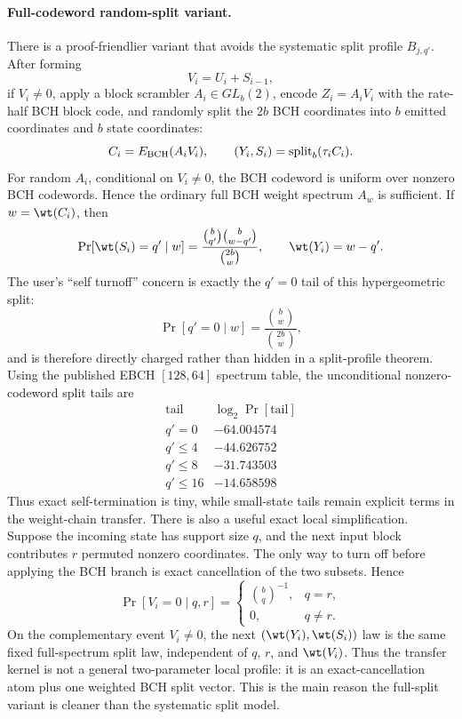 \paragraph{Full-codeword random-split variant.}
There is a proof-friendlier variant that avoids the systematic split profile \(B_{j,q'}\).  After forming
\[
V_i=U_i+S_{i-1},
\]
if \(V_i\ne0\), apply a block scrambler \(A_i\in GL_b(2)\), encode \(Z_i=A_iV_i\) with the rate-half BCH block code,
and randomly split the \(2b\) BCH coordinates into \(b\) emitted coordinates and \(b\) state coordinates:
\[
C_i=E_{\rm BCH}(A_iV_i),\qquad (Y_i,S_i)=\operatorname{split}_b(\tau_i C_i).
\]
For random \(A_i\), conditional on \(V_i\ne0\), the BCH codeword is uniform over nonzero BCH codewords.  Hence the
ordinary full BCH weight spectrum \(A_w\) is sufficient.  If \(w=\wt(C_i)\), then
\[
\Pr[\wt(S_i)=q'\mid w]
=
\frac{\binom{b}{q'}\binom{b}{w-q'}}{\binom{2b}{w}},
\qquad
\wt(Y_i)=w-q'.
\]
The user's ``self turnoff'' concern is exactly the \(q'=0\) tail of this hypergeometric split:
\[
\Pr[q'=0\mid w]=\frac{\binom{b}{w}}{\binom{2b}{w}},
\]
and is therefore directly charged rather than hidden in a split-profile theorem.  Using the published
EBCH \([128,64]\) spectrum table, the unconditional nonzero-codeword split tails are
\[
\begin{array}{c|c}
\text{tail} & \log_2\Pr[\text{tail}]\\
\hline
q'=0 & -64.004574\\
q'\le4 & -44.626752\\
q'\le8 & -31.743503\\
q'\le16 & -14.658598
\end{array}
\]
Thus exact self-termination is tiny, while small-state tails remain explicit terms in the weight-chain transfer.
There is also a useful exact local simplification.  Suppose the incoming state has support size \(q\), and the next
input block contributes \(r\) permuted nonzero coordinates.  The only way to turn off before applying the BCH branch is
exact cancellation of the two subsets.  Hence
\[
\Pr[V_i=0\mid q,r]
=
\begin{cases}
\binom{b}{q}^{-1}, & q=r,\\
0, & q\ne r.
\end{cases}
\]
On the complementary event \(V_i\ne0\), the next \((\wt(Y_i),\wt(S_i))\) law is the same fixed full-spectrum split law,
independent of \(q\), \(r\), and \(\wt(V_i)\).  Thus the transfer kernel is not a general two-parameter local profile:
it is an exact-cancellation atom plus one weighted BCH split vector.  This is the main reason the full-split variant is
cleaner than the systematic split model.


